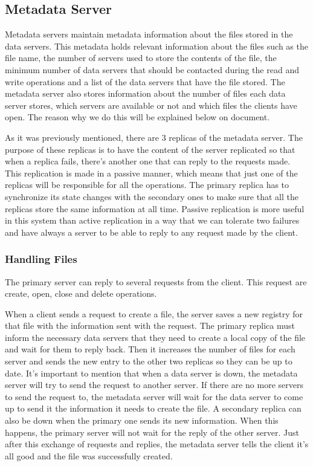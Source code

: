 \subsection{Metadata Server}

Metadata servers maintain metadata information about the files stored
in the data servers. This metadata holds relevant information about
the files such as the file name, the number of servers used to store
the contents of the file, the minimum number of data servers that should
be contacted during the read and write operations and a list of the
data servers that have the file stored. The metadata server also stores
information about the number of files each data server stores, which
servers are available or not and which files the clients have open.
The reason why we do this will be explained below on document.

As it was previously mentioned, there are 3 replicas of the metadata
server. The purpose of these replicas is to have the content of the
server replicated so that when a replica fails, there's another one
that can reply to the requests made. This replication is made in a
passive manner, which means that just one of the replicas will be
responsible for all the operations. The primary replica has to
synchronize its state changes with the secondary ones to make sure that all
the replicas store the same information at all time. Passive replication
is more useful in this system than active replication in a way that we
can tolerate two failures and have always a server to be able to reply to
any request made by the client.

\subsubsection{Handling Files}

The primary server can reply to several requests from the client. This
request are create, open, close and delete operations.

When a client sends a request to create a file, the server saves a new
registry for that file with the information sent with the request. The
primary replica must inform the necessary data servers that they need to
create a local copy of the file and wait for them to reply back. Then
it increases the number of files for each server and sends the new 
entry to the other two replicas so they can be up to date. It's important 
to mention that when a data server is down, the metadata server will try 
to send the request to another server. If there are no more servers to 
send the request to, the metadata server will wait for the data server 
to come up to send it the information it needs to create the file. A 
secondary replica can also be down when the primary one sends its new 
information. When this happens, the primary server will not wait for 
the reply of the other server. Just after this exchange of requests and
replies, the metadata server tells the client it's all good and the file 
was successfully created.

